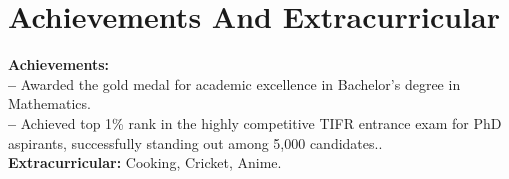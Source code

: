 \documentclass[a4paper,10pt]{article}
\makeatletter
\newcommand{\resumeSubheading}[4]{
\vspace{0.5mm}\item[]
    \begin{tabular*}{0.98\textwidth}[t]{l@{\extracolsep{\fill}}r}
        \textbf{#1} & \textit{\footnotesize{#4}} \\
        \textit{\footnotesize{#3}} &  \footnotesize{#2}\\
    \end{tabular*}
    \vspace{-1.0mm}
}
\newcommand{\resumeSubHeadingListStart}{\begin{itemize}[leftmargin=*,labelsep=0mm]}
\newcommand{\resumeItemListStart}{\begin{justify}\begin{itemize}[leftmargin=3ex, rightmargin=2ex, noitemsep,labelsep=1.2mm,itemsep=0.8mm]\small}
\newcommand{\resumeSubHeadingListEnd}{\end{itemize}\vspace{2mm}}
\newcommand{\resumeItemListEnd}{\end{itemize}\end{justify}\vspace{-2mm}}
\makeatother
\begin{document}
\section{\textbf{Achievements And Extracurricular}}
\begin{itemize}[leftmargin=0.05in, label={}]
    \small{\item{
\textbf{Achievements: }\small\\ 
\textbf{-- }{Awarded the gold medal for academic excellence in Bachelor's degree in Mathematics.}\small\\
 \textbf{-- }{Achieved top 1\% rank in the highly competitive TIFR entrance exam for PhD aspirants, successfully standing out among 5,000 candidates..}\small\\
\vspace{1mm}
     \textbf{Extracurricular: }{Cooking, Cricket, Anime.} \\
    }}
 \end{itemize}
\vspace{-5mm}



    
  
\end{document}
